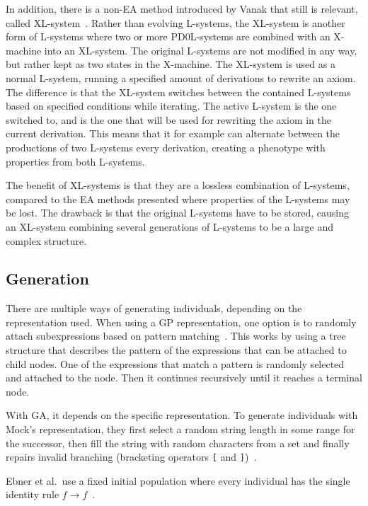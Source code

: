 In addition, there is a non-\gls{EA} method introduced by Vanak that still is relevant, called XL-system~\cite{2000Vanak}.
Rather than evolving \glspl{L-system}, the XL-system is another form of \glspl{L-system} where two or more PD0L-systems are combined with an X-machine into an XL-system.
The original \glspl{L-system} are not modified in any way, but rather kept as two states in the X-machine.
The XL-system is used as a normal \gls{L-system}, running a specified amount of derivations to rewrite an axiom.
The difference is that the XL-system switches between the contained \glspl{L-system} based on specified conditions while iterating.
The active \gls{L-system} is the one switched to, and is the one that will be used for rewriting the axiom in the current derivation.
This means that it for example can alternate between the productions of two \glspl{L-system} every derivation, creating a phenotype with properties from both \glspl{L-system}.

The benefit of XL-systems is that they are a lossless combination of \glspl{L-system}, compared to the \gls{EA} methods presented where properties of the \glspl{L-system} may be lost.
The drawback is that the original \glspl{L-system} have to be stored, causing an XL-system combining several generations of \glspl{L-system} to be a large and complex structure.

\subsection{Generation}
There are multiple ways of generating individuals, depending on the representation used.
When using a \gls{GP} representation, one option is to randomly attach subexpressions based on pattern matching~\cite{1994Jacob}.
This works by using a tree structure that describes the pattern of the expressions that can be attached to child nodes. One of the expressions that match a pattern is randomly selected and attached to the node. Then it continues recursively until it reaches a terminal node.

With \gls{GA}, it depends on the specific representation.
To generate individuals with Mock's representation, they first select a random string length in some range for the successor, then fill the string with random characters from a set and finally repairs invalid branching (bracketing operators \texttt{[} and \texttt{]})~\cite{1998Mock}.

Ebner et al.\ use a fixed initial population where every individual has the single identity rule $f\rightarrow f$~\cite{2002Ebner}.

